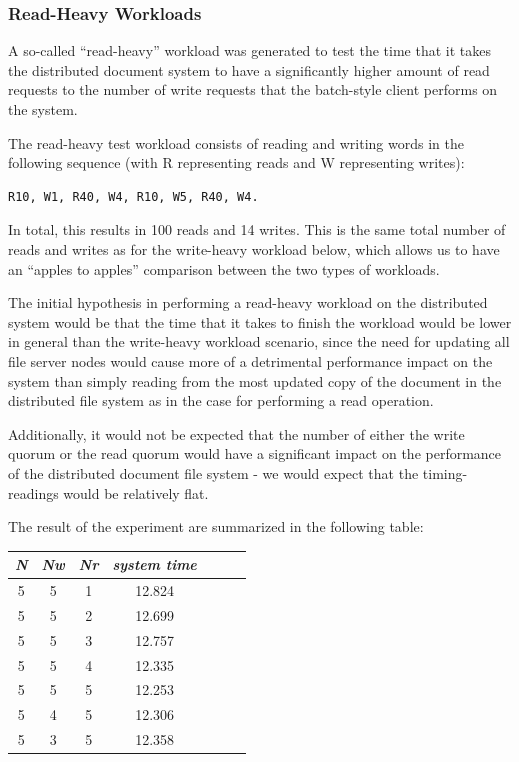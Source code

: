 \documentclass
[english,a4paper]{article}
\begin{document}
\subsubsection{Read-Heavy Workloads}

A so-called ``read-heavy'' workload was generated to test the time
that it takes the distributed document system to have a significantly
higher amount of read requests to the number of write requests that
the batch-style client performs on the system. 

The read-heavy test workload consists of reading and writing words
in the following sequence (with R representing reads and W
representing writes): 

\begin{verbatim}
R10, W1, R40, W4, R10, W5, R40, W4. 
\end{verbatim}

In total, this results in 100 reads and 14 writes. This is the same
total number of reads and writes as for the write-heavy workload
below, which allows us to have an ``apples to apples'' comparison
between the two types of workloads.

The initial hypothesis in performing a read-heavy workload on the
distributed system would be that the time that it takes to finish the
workload would be lower in general than the write-heavy workload
scenario, since the need for updating all file server nodes would
cause more of a detrimental performance impact on the system than
simply reading from the most updated copy of the document in the
distributed file system as in the case for performing a read
operation.

Additionally, it would not be expected that the number of  either the
write quorum or the read quorum would have a significant impact on the
performance of the distributed document file system - we would expect
that the timing-readings would be relatively flat.

The result of the experiment are summarized in the following table:

\begin{center}
\begin{tabular}{| c | c | c | c | c | c | c}
\hline
\emph{N} & \emph{Nw} & \emph{Nr} & \emph{system time}\\ \hline
5 &5 & 1 & 12.824 \\ \hline
5 &5 & 2 & 12.699 \\ \hline
5 &5 & 3 & 12.757 \\ \hline
5 &5 & 4 & 12.335 \\ \hline
5 &5 & 5 & 12.253 \\ \hline
5 &4 & 5 & 12.306 \\ \hline
5 &3 & 5 & 12.358 \\ \hline
\end{tabular}
\end{center}
\end{document}
